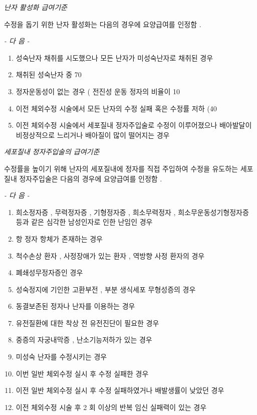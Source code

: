 {\par  
\emph{난자 활성화 급여기준}\par 
수정을 돕기 위한 난자 활성화는 다음의 경우에 요양급여를 인정함 . \par

\emph{-  다 음  -}\par  
\begin{enumerate}[가.]\tightlist
\item 성숙난자 채취를 시도했으나 모든 난자가 미성숙난자로 채취된 경우 
\item 채취된 성숙난자 중  70%
\item 정자운동성이 없는 경우 ( 전진성 운동 정자의 비율이  10%
\item 이전 체외수정 시술에서 모든 난자의 수정 실패 혹은 수정률  저하 (40%
\item 이전 체외수정 시술에서 세포질내 정자주입술로 수정이  이루어졌으나 배아발달이 비정상적으로 느리거나 배아질이  많이 떨어지는 경우 
\end{enumerate} 

\par 
\emph{세포질내  정자주입술의  급여기준} \par 
수정률을 높이기 위해 난자의 세포질내에 정자를 직접 주입하여 수정을 유도하는 세포질내 정자주입술은 다음의 경우에 요양급여를 인정함 . \par

\emph{-  다 음  -}\par 
\begin{enumerate}[가.]\tightlist
\item 희소정자증 ,  무력정자증 ,  기형정자증 ,  희소무력정자 ,  희소무운동성기형정자증 등과 같은 심각한 남성인자로 인한 난임인 경우 
\item 항 정자 항체가 존재하는 경우 
\item 척수손상 환자 ,  사정장애가 있는 환자 ,  역방향 사정 환자의 경우 
\item 폐쇄성무정자증인 경우  
\item 성숙정지에 기인한 고환부전 ,  부분 생식세포 무형성증의 경우 
\item 동결보존된 정자나 난자를 이용하는 경우  
\item 유전질환에 대한 착상 전 유전진단이 필요한 경우 
\item 중증의 자궁내막증 ,  난소기능저하가 있는 경우 
\item 미성숙 난자를 수정시키는 경우 
\item 이번 일반 체외수정 실시 후 수정 실패한 경우  
\item 이전 일반 체외수정 실시 후 수정 실패하였거나 배발생률이 낮았던 경우 
\item 이전 체외수정 시술 후  2 회 이상의 반복 임신 실패력이 있는 경우 
\end{enumerate} 

}
